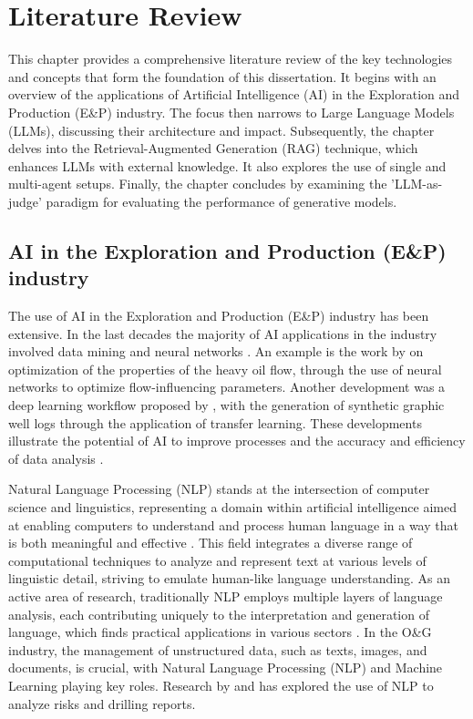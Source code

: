    
\chapter{Literature Review} 


    This chapter provides a comprehensive literature review of the key technologies and concepts that form the foundation of this dissertation. It begins with an overview of the applications of Artificial Intelligence (AI) in the Exploration and Production (E\&P) industry. The focus then narrows to Large Language Models (LLMs), discussing their architecture and impact. Subsequently, the chapter delves into the Retrieval-Augmented Generation (RAG) technique, which enhances LLMs with external knowledge. It also explores the use of single and multi-agent setups. Finally, the chapter concludes by examining the 'LLM-as-judge' paradigm for evaluating the performance of generative models.


    \section{AI in the Exploration and Production (E\&P) industry}

        The use of AI in the Exploration and Production (E\&P) industry has been extensive. 
        In the last decades the majority of AI applications in the industry involved data mining and neural networks \citep{Bravo2014}. 
        An example is the work by \citep{Gudala2021} on optimization of the properties of the heavy oil flow, through the use of neural networks to optimize flow-influencing parameters.
        Another development was a deep learning workflow proposed by \citep{Gohari2024}, with the generation of synthetic graphic well logs through the application of transfer learning. 
        These developments illustrate the potential of AI to improve processes and the accuracy and efficiency of data analysis \citep{Rahmani2021}.
    
        Natural Language Processing (NLP) stands at the intersection of computer science and linguistics, representing a domain within artificial intelligence aimed at enabling computers to understand and process human language in a way that is both meaningful and effective \citep{Liddy2001}. 
        This field integrates a diverse range of computational techniques to analyze and represent text at various levels of linguistic detail, striving to emulate human-like language understanding. 
        As an active area of research, traditionally NLP employs multiple layers of language analysis, each contributing uniquely to the interpretation and generation of language, which finds practical applications in various sectors \citep{Liddy2001}.      
        In the O\&G industry, the management of unstructured data, such as texts, images, and documents, is crucial, with Natural Language Processing (NLP) and Machine Learning playing key roles.
        Research by \citet{Antoniak2016} and \citet{Castineira2018} has explored the use of NLP to analyze risks and drilling reports.           
    
